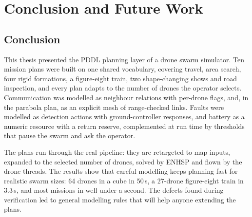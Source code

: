 \documentclass[11pt,a4paper,oneside]{report}
\begin{document}
\chapter{Conclusion and Future Work}\label{ch:conclusion}

\section{Conclusion}
This thesis presented the PDDL planning layer of a drone swarm simulator. Ten mission plans were
built on one shared vocabulary, covering travel, area search, four rigid formations, a
figure-eight train, two shape-changing shows and road inspection, and every plan adapts to the
number of drones the operator selects. Communication was modelled as neighbour relations with
per-drone flags, and, in the parabola plan, as an explicit mesh of range-checked links. Faults
were modelled as detection actions with ground-controller responses, and battery as a numeric
resource with a return reserve, complemented at run time by thresholds that pause the swarm and
ask the operator.

The plans run through the real pipeline: they are retargeted to map inputs, expanded to the
selected number of drones, solved by ENHSP and flown by the drone threads. The results show that
careful modelling keeps planning fast for realistic swarm sizes: 64 drones in a cube in 50\,s,
a 27-drone figure-eight train in 3.3\,s, and most missions in well under a second. The defects
found during verification led to general modelling rules that will help anyone extending the
plans.
\end{document}
